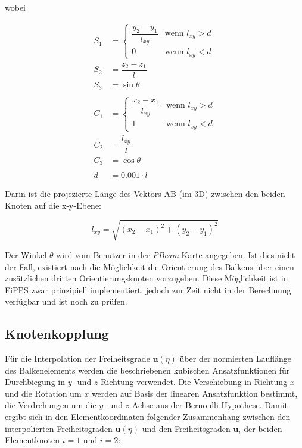 \documentclass[11pt,titlepage,listof=totoc,bibliography=totoc,twoside]{scrreprt}
\begin{document}
wobei

\begin{align}
S_1	&=	\begin{cases}\dfrac{y_2-y_1}{l_{xy}}	&	\mbox{wenn } l_{xy}>d\\0	&	\mbox{wenn } l_{xy}<d\end{cases}	\\
S_2	&=	\dfrac{z_2-z_1}{l}	\\
S_3	&=	\sin{\theta}		\\
\\
C_1	&=	\begin{cases}\dfrac{x_2-x_1}{l_{xy}}	&	\mbox{wenn } l_{xy}>d\\1	&	\mbox{wenn } l_{xy}<d\end{cases}	\\
C_2	&=	\dfrac{l_{xy}}{l}	\\
C_3	&=	\cos{\theta}		\\
\\
d	&=	0.001\cdot l
\end{align}

Darin ist die projezierte Länge des Vektors AB (im 3D) zwischen den beiden Knoten auf die x-y-Ebene:

\begin{equation}
l_{xy} = \sqrt{\left(x_2-x_1\right)^2+\left(y_2-y_1\right)^2}
\end{equation}

Der Winkel $\theta$ wird vom Benutzer in der \emph{PBeam}-Karte angegeben. Ist dies nicht der Fall, existiert nach \cite{ANSYSTheoryReference} die Möglichkeit die Orientierung des Balkens über einen zusätzlichen dritten Orientierungsknoten vorzugeben. Diese Möglichkeit ist in FiPPS zwar prinzipiell implementiert, jedoch zur Zeit nicht in der Berechnung verfügbar und ist noch zu prüfen.

\subsection{Knotenkopplung}

Für die Interpolation der Freiheitsgrade $\mathbf{u}\left(\eta\right)$ über der normierten Lauflänge des Balkenelements werden die beschriebenen kubischen Ansatzfunktionen für Durchbiegung in $y$- und $z$-Richtung verwendet. Die Verschiebung in Richtung $x$ und die Rotation um $x$ werden auf Basis der linearen Ansatzfunktion bestimmt, die Verdrehungen um die $y$- und $z$-Achse aus der Bernoulli-Hypothese. Damit ergibt sich in den Elementkoordinaten folgender Zusammenhang zwischen den interpolierten Freiheitsgraden $\mathbf{u}\left(\eta\right)$ und den Freiheitsgraden $\mathbf{u}_i$ der beiden Elementknoten $i=1$ und $i=2$:
\end{document}
